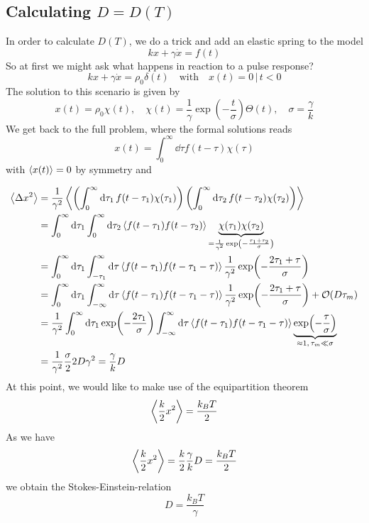 \documentclass{notebook}
\begin{document}
\subsection*{Calculating $D = D(T)$}

In order to calculate $D(T)$, we do a trick and add an elastic spring to the model
%
\begin{equation}
k x + \gamma \dot{x} = f(t)
\end{equation}
%
So at first we might ask what happens in reaction to a pulse response?
%
\begin{equation}
k x + \gamma \dot{x} = \rho_0 \delta(t) \quad \mathrm{with} \quad x(t) = 0 \, | \, t < 0
\end{equation}
%
The solution to this scenario is given by
%
\begin{equation}
x(t) = \rho_0 \chi(t), \quad \chi(t) = \frac{1}{\gamma} \exp(-\frac{t}{\sigma}) \Theta(t), \quad \sigma = \frac{\gamma}{k}
\end{equation}
%
We get back to the full problem, where the formal solutions reads
%
\begin{equation}
x(t) =  \int_0^{\infty}{\dd{\tau} f(t - \tau) \chi(\tau)}
\end{equation}
%
with $\expval{x(t)} = 0$ by symmetry and 

\begin{align*}
\expval{\Delta x^2} &= \frac{1}{\gamma^2} \expval{\left( \int_0^{\infty}{\dd{\tau_1} f(t-\tau_1) \chi(\tau_1)} \right) \left( \int_0^{\infty}{\dd{\tau_2} f(t-\tau_2) \chi(\tau_2)} \right)} \\
&= \int_0^{\infty} \dd{\tau_1} \int_0^{\infty} \dd{\tau_2} \expval{f(t-\tau_1) f(t-\tau_2)} \underbrace{\chi(\tau_1) \chi(\tau_2)}_{= \frac{1}{\gamma^2} \exp(- \frac{\tau_1 + \tau_2}{\sigma})} \\
&= \int_0^{\infty} \dd{\tau_1} \int_{-\tau_1}^{\infty} \dd{\tau} \expval{f(t-\tau_1) f(t-\tau_1 - \tau)}  \frac{1}{\gamma^2} \exp(- \frac{2\tau_1 + \tau}{\sigma}) \\
&= \int_0^{\infty} \dd{\tau_1} \int_{-\infty}^{\infty} \dd{\tau} \expval{f(t-\tau_1) f(t-\tau_1 - \tau)}  \frac{1}{\gamma^2} \exp(- \frac{2\tau_1 + \tau}{\sigma}) + \mathcal{O}(D\tau_m) \\
&= \frac{1}{\gamma^2} \int_0^{\infty} \dd{\tau_1} \exp(- \frac{2\tau_1}{\sigma}) \int_{-\infty}^{\infty} \dd{\tau} \expval{f(t-\tau_1) f(t-\tau_1 - \tau)} \underbrace{\exp(- \frac{\tau}{\sigma})}_{\approx 1, \, \tau_m \ll \sigma} \\
&= \frac{1}{\gamma^2} \frac{\sigma}{2} 2 D \gamma^2 = \frac{\gamma}{k}D
\end{align*}
%
At this point, we would like to make use of the equipartition theorem
%
\begin{equation}
\expval{\frac{k}{2}x^2} = \frac{k_B T}{2}
\end{equation}
%
As we have 
%
\begin{equation}
\expval{\frac{k}{2}x^2} = \frac{k}{2} \frac{\gamma}{k}D = \frac{k_B T}{2}
\end{equation}
%
we obtain the Stokes-Einstein-relation
%
\begin{equation}
D = \frac{k_B T}{\gamma}
\end{equation}
%
\end{document}
